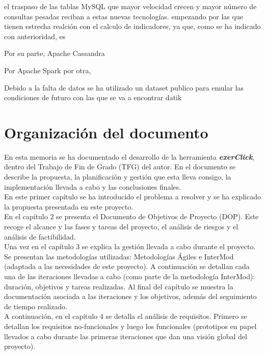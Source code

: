 el traspaso de las tablas MySQL que mayor velocidad crecen  y mayor número de consultas pesadas reciban a estas nuevas tecnologías. empezando por las que tienen estrecha realción con el calculo de indicadores, ya que, como se ha indicado con anterioridad, es  

Por su parte, Apache Cassandra

Por Apache Spark por otra,

Debido a la falta de datos se ha utilizado un dataset publico para emular las condiciones de futuro con las que se va a encontrar datik

\section{Organización del documento}

En esta memoria se ha documentado  el desarrollo de la herramienta \textbf{\textit{exerClick}}, dentro del Trabajo de Fin de Grado (TFG) del autor. En el documento se describe la propuesta, la planificación y gestión que esta lleva consigo, la implementación llevada a cabo y las conclusiones finales.\\

En este primer capítulo se ha introducido el problema a resolver y se ha explicado la propuesta presentada en este proyecto.\\

En el capítulo 2 se presenta el Documento de Objetivos de Proyecto (DOP). Este recoge el alcance y las fases y tareas del proyecto, el análisis de riesgos y el análisis de factibilidad.\\

Una vez en el capítulo 3 se explica la gestión llevada a cabo durante el proyecto. Se presentan las metodologías utilizadas: Metodologías Ágiles e InterMod (adaptada a las necesidades de este proyecto). A continuación se detallan cada una de las iteraciones llevadas a cabo (como parte de la metodología InterMod): duración, objetivos y tareas realizadas. Al final del capítulo se muestra la documentación asociada a las iteraciones y los objetivos, además del seguimiento de tiempo realizado.\\

A continuación, en el capítulo 4 se detalla el análisis de requisitos. Primero se detallan los requisitos no-funcionales y luego los funcionales (prototipos en papel llevados a cabo durante las primeras iteraciones que dan una visión global del proyecto).\\

